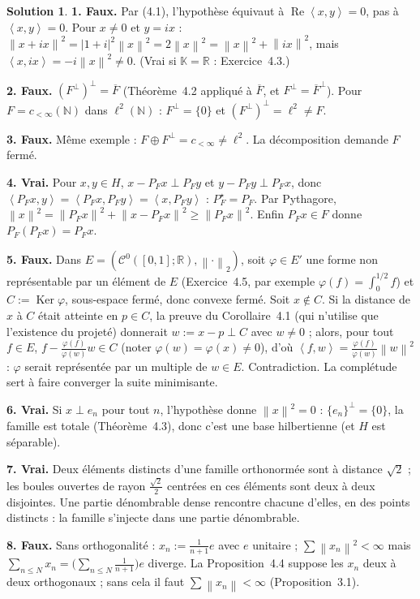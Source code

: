 \documentclass[11pt,a4paper]{article}
\newcommand{\R}{\mathbb{R}}
\newcommand{\N}{\mathbb{N}}
\newcommand{\K}{\mathbb{K}}
\newcommand{\adh}[1]{\overline{#1}}
\newcommand{\norm}[1]{\left\|#1\right\|}
\newcommand{\ps}[2]{\left\langle #1,#2\right\rangle}
\newcommand{\Cz}{\mathcal{C}^0}
\DeclareMathOperator{\Ker}{Ker}
\renewcommand{\Re}{\operatorname{Re}}
\theoremstyle{definition}
\newtheorem*{solution}{Solution}
\begin{document}
\begin{solution}
\noindent\textbf{1. Faux.} Par (4.1), l'hypothèse équivaut à $\Re\ps xy=0$, pas à $\ps xy=0$. Pour $x\ne0$ et $y=ix$ : $\norm{x+ix}^2=|1+i|^2\norm x^2=2\norm x^2=\norm x^2+\norm{ix}^2$, mais $\ps x{ix}=-i\norm x^2\ne0$. (Vrai si $\K=\R$ : Exercice~4.3.)

\medskip
\noindent\textbf{2. Faux.} $(F^\perp)^\perp=\adh F$ (Théorème~4.2 appliqué à $\adh F$, et $F^\perp=\adh F^\perp$). Pour $F=c_{<\infty}(\N)$ dans $\ell^2(\N)$ : $F^\perp=\{0\}$ et $(F^\perp)^\perp=\ell^2\ne F$.

\medskip
\noindent\textbf{3. Faux.} Même exemple : $F\oplus F^\perp=c_{<\infty}\ne\ell^2$. La décomposition demande $F$ fermé.

\medskip
\noindent\textbf{4. Vrai.} Pour $x,y\in H$, $x-P_Fx\perp P_Fy$ et $y-P_Fy\perp P_Fx$, donc $\ps{P_Fx}y=\ps{P_Fx}{P_Fy}=\ps x{P_Fy}$ : $P_F^\star=P_F$. Par Pythagore, $\norm x^2=\norm{P_Fx}^2+\norm{x-P_Fx}^2\ge\norm{P_Fx}^2$. Enfin $P_Fx\in F$ donne $P_F(P_Fx)=P_Fx$.

\medskip
\noindent\textbf{5. Faux.} Dans $E=(\Cz([0,1];\R),\norm\cdot_2)$, soit $\varphi\in E'$ une forme non représentable par un élément de $E$ (Exercice~4.5, par exemple $\varphi(f)=\int_0^{1/2}f$) et $C:=\Ker\varphi$, sous-espace fermé, donc convexe fermé. Soit $x\notin C$. Si la distance de $x$ à $C$ était atteinte en $p\in C$, la preuve du Corollaire~4.1 (qui n'utilise que l'existence du projeté) donnerait $w:=x-p\perp C$ avec $w\ne0$ ; alors, pour tout $f\in E$, $f-\frac{\varphi(f)}{\varphi(w)}w\in C$ (noter $\varphi(w)=\varphi(x)\ne0$), d'où $\ps fw=\frac{\varphi(f)}{\varphi(w)}\norm w^2$ : $\varphi$ serait représentée par un multiple de $w\in E$. Contradiction. La complétude sert à faire converger la suite minimisante.

\medskip
\noindent\textbf{6. Vrai.} Si $x\perp e_n$ pour tout $n$, l'hypothèse donne $\norm x^2=0$ : $\{e_n\}^\perp=\{0\}$, la famille est totale (Théorème~4.3), donc c'est une base hilbertienne (et $H$ est séparable).

\medskip
\noindent\textbf{7. Vrai.} Deux éléments distincts d'une famille orthonormée sont à distance $\sqrt2$ ; les boules ouvertes de rayon $\frac{\sqrt2}2$ centrées en ces éléments sont deux à deux disjointes. Une partie dénombrable dense rencontre chacune d'elles, en des points distincts : la famille s'injecte dans une partie dénombrable.

\medskip
\noindent\textbf{8. Faux.} Sans orthogonalité : $x_n:=\frac1{n+1}e$ avec $e$ unitaire ; $\sum\norm{x_n}^2<\infty$ mais $\sum_{n\le N}x_n=\big(\sum_{n\le N}\frac1{n+1}\big)e$ diverge. La Proposition~4.4 suppose les $x_n$ deux à deux orthogonaux ; sans cela il faut $\sum\norm{x_n}<\infty$ (Proposition~3.1).


\end{solution}
\end{document}
